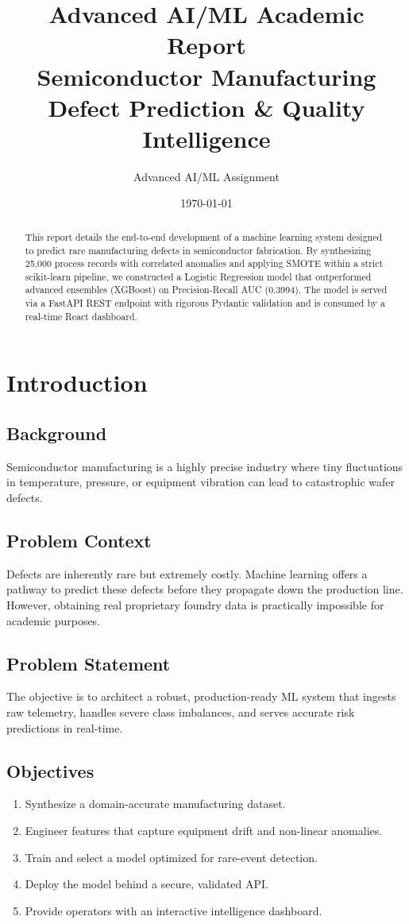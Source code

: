 \documentclass[12pt, a4paper]{article}
\title{\textbf{Advanced AI/ML Academic Report}\\ Semiconductor Manufacturing Defect Prediction \& Quality Intelligence}
\author{Advanced AI/ML Assignment}
\date{\today}
\begin{document}
\maketitle

\begin{abstract}
This report details the end-to-end development of a machine learning system designed to predict rare manufacturing defects in semiconductor fabrication. By synthesizing 25,000 process records with correlated anomalies and applying SMOTE within a strict scikit-learn pipeline, we constructed a Logistic Regression model that outperformed advanced ensembles (XGBoost) on Precision-Recall AUC (0.3994). The model is served via a FastAPI REST endpoint with rigorous Pydantic validation and is consumed by a real-time React dashboard.
\end{abstract}

\tableofcontents
\newpage

\section{Introduction}
\subsection{Background}
Semiconductor manufacturing is a highly precise industry where tiny fluctuations in temperature, pressure, or equipment vibration can lead to catastrophic wafer defects.

\subsection{Problem Context}
Defects are inherently rare but extremely costly. Machine learning offers a pathway to predict these defects before they propagate down the production line. However, obtaining real proprietary foundry data is practically impossible for academic purposes.

\subsection{Problem Statement}
The objective is to architect a robust, production-ready ML system that ingests raw telemetry, handles severe class imbalances, and serves accurate risk predictions in real-time.

\subsection{Objectives}
\begin{enumerate}
    \item Synthesize a domain-accurate manufacturing dataset.
    \item Engineer features that capture equipment drift and non-linear anomalies.
    \item Train and select a model optimized for rare-event detection.
    \item Deploy the model behind a secure, validated API.
    \item Provide operators with an interactive intelligence dashboard.
\end{enumerate}
\end{document}
